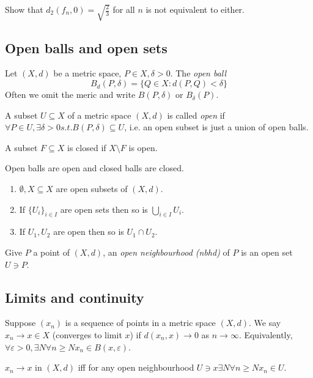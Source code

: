 \documentclass[a4paper]{article}
\begin{document}
\begin{center}
\end{center}

\begin{ex}
  Show that $d_2(f_n,0) = \sqrt{\frac{2}{3}}$ for all $n$ is not equivalent to either.
\end{ex}

\subsection{Open balls and open sets}

Let $(X,d)$ be a metric space, $P\in X, \delta > 0$. The \emph{open ball}
\[
  B_d(P,\delta) = \{Q\in X: d(P,Q) < \delta\}
\]
Often we omit the meric and write $B(P,\delta)$ or $B_\delta(P)$.

\begin{defi}
  A subset $U \subseteq X$ of a metric space $(X,d)$ is called \emph{open} if $\forall P \in U, \exists \delta>0 s.t. B(P,\delta)\subseteq U$, i.e. an open subset is just a union of open balls.

  A subset $F\subseteq X$ is closed if $X\setminus F$ is open.
\end{defi}

Open balls are open and closed balls are closed.

\begin{lem}\leavevmode
  \begin{enumerate}
  \item $\emptyset, X \subseteq X$ are open subsets of $(X,d)$.
  \item If $\{U_i\}_{i\in I}$ are open sets then so is $\bigcup_{i\in I} U_i$.
    \item If $U_1, U_2$ are open then so is $U_1 \cap U_2$.
  \end{enumerate}
\end{lem}

\begin{defi}
  Give $P$ a point of $(X,d)$, an \emph{open neighbourhood (nbhd)} of $P$ is an open set $U \ni P$.
\end{defi}

\subsection{Limits and continuity}

Suppose $(x_n)$ is a sequence of points in a metric space $(X,d)$. We say $x_n \to x\in X$ (converges to limit $x$) if $d(x_n,x) \to 0$ as $n \to \infty$. Equivalently, $\forall \varepsilon>0, \exists N \forall n\geq N x_n \in B(x, \varepsilon)$.

\begin{rmk}
  $x_n \to x$ in $(X,d)$ iff for any open neighbourhood $U \ni x \exists N \forall n\geq N x_n \in U$. 
\end{rmk}
\end{document}
